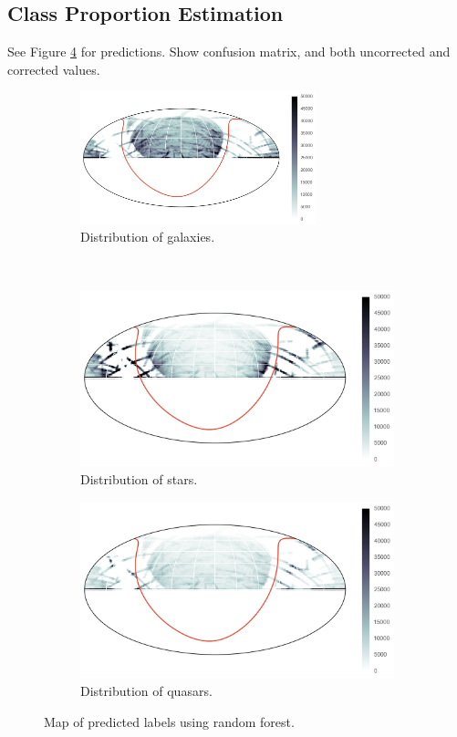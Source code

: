 \subsection{Class Proportion Estimation}
See Figure \ref{fig:forest} for predictions. Show confusion matrix, and
both uncorrected and corrected values.
\begin{figure}[p]
	\centering
	\begin{subfigure}{\textwidth}
		\centering
		\includegraphics[width=0.75\textwidth]{figures/map_prediction_forest_galaxies}
		\caption{Distribution of galaxies.}
		\label{fig:random1}
	\end{subfigure}\\
	\begin{subfigure}{\textwidth}
		\centering
		\includegraphics[width=0.75\linewidth]{figures/map_prediction_forest_stars}
		\caption{Distribution of stars.}
		\label{fig:random2}
	\end{subfigure}
	\begin{subfigure}{\textwidth}
		\centering
		\includegraphics[width=0.75\linewidth]{figures/map_prediction_forest_quasars}
		\caption{Distribution of quasars.}
		\label{fig:random3}
	\end{subfigure}
	\caption{Map of predicted labels using random forest.}
	\label{fig:forest}
\end{figure}


